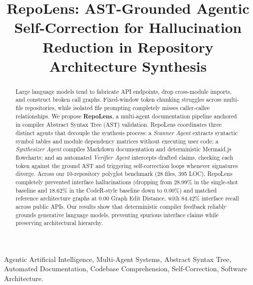 \documentclass[conference]{IEEEtran}
\begin{document}
\title{RepoLens: AST-Grounded Agentic Self-Correction for Hallucination Reduction in Repository Architecture Synthesis}

\author{
}

\maketitle

\begin{abstract}
Large language models tend to fabricate API endpoints, drop cross-module imports, and construct broken call graphs. Fixed-window token chunking struggles across multi-file repositories, while isolated file prompting completely misses caller-callee relationships. We propose \textbf{RepoLens}, a multi-agent documentation pipeline anchored in compiler Abstract Syntax Tree (AST) validation. RepoLens coordinates three distinct agents that decouple the synthesis process: a \textit{Scanner Agent} extracts syntactic symbol tables and module dependency matrices without executing user code; a \textit{Synthesizer Agent} compiles Markdown documentation and deterministic Mermaid.js flowcharts; and an automated \textit{Verifier Agent} intercepts drafted claims, checking each token against the ground AST and triggering self-correction loops whenever signatures diverge. Across our 10-repository polyglot benchmark (28 files, 395 LOC), RepoLens completely prevented interface hallucinations (dropping from $28.99\%$ in the single-shot baseline and $18.62\%$ in the CodeR-style baseline down to $0.00\%$) and matched reference architecture graphs at $0.00$ Graph Edit Distance, with $84.42\%$ interface recall across public APIs. Our results show that deterministic compiler feedback reliably grounds generative language models, preventing spurious interface claims while preserving architectural hierarchy.
\end{abstract}

\begin{IEEEkeywords}
Agentic Artificial Intelligence, Multi-Agent Systems, Abstract Syntax Tree, Automated Documentation, Codebase Comprehension, Self-Correction, Software Architecture.
\end{IEEEkeywords}
\end{document}
